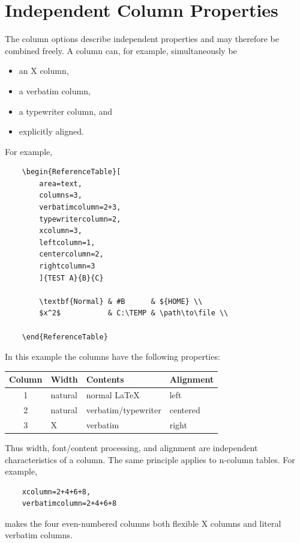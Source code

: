 \documentclass[
11pt,
a4paper,
oneside
]{scrbook}
\begin{document}
{%
\section{Independent Column Properties}

The column options describe independent properties and may therefore be
combined freely.
A column can, for example, simultaneously be
\begin{itemize}
	\item an X column,
	\item a verbatim column,
	\item a typewriter column, and
	\item explicitly aligned.
\end{itemize}
For example,
\begin{verbatim}
	\begin{ReferenceTable}[
		area=text,
		columns=3,
		verbatimcolumn=2+3,
		typewritercolumn=2,
		xcolumn=3,
		leftcolumn=1,
		centercolumn=2,
		rightcolumn=3
		]{TEST A}{B}{C}
		
		\textbf{Normal} & #B      & ${HOME} \\
		$x^2$           & C:\TEMP & \path\to\file \\
		
	\end{ReferenceTable}
\end{verbatim}

In this example the columns have the following properties:
\begin{center}
	\begin{tabular}{clll}
		\toprule
		Column & Width & Contents & Alignment \\
		\midrule
		1 & natural & normal \LaTeX{} & left \\
		2 & natural & verbatim/typewriter & centered \\
		3 & X & verbatim & right \\
		\bottomrule
	\end{tabular}
\end{center}
Thus width, font/content processing, and alignment are independent
characteristics of a column.
The same principle applies to n-column tables. For example,
\begin{verbatim}
	xcolumn=2+4+6+8,
	verbatimcolumn=2+4+6+8
\end{verbatim}
makes the four even-numbered columns both flexible X columns and literal
verbatim columns.

}
\end{document}
